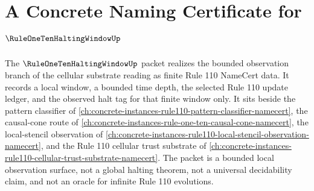 \chapter{A Concrete Naming Certificate for $\RuleOneTenHaltingWindowUp$}
\label{ch:concrete-instances-rule-one-ten-halting-window-namecert}

The $\RuleOneTenHaltingWindowUp$ packet realizes the bounded observation branch of the cellular substrate reading as finite Rule 110 NameCert data. It records a local window, a bounded time depth, the selected Rule 110 update ledger, and the observed halt tag for that finite window only. It sits beside the pattern classifier of \autoref{ch:concrete-instances-rule110-pattern-classifier-namecert}, the causal-cone route of \autoref{ch:concrete-instances-rule-one-ten-causal-cone-namecert}, the local-stencil observation of \autoref{ch:concrete-instances-rule110-local-stencil-observation-namecert}, and the Rule 110 cellular trust substrate of \autoref{ch:concrete-instances-rule110-cellular-trust-substrate-namecert}. The packet is a bounded local observation surface, not a global halting theorem, not a universal decidability claim, and not an oracle for infinite Rule 110 evolutions.

